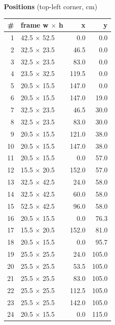 \documentclass[a4paper,landscape,10pt]{article}
\begin{document}
\begin{minipage}[t]{0.25\textwidth}
\vspace{8pt}
{\bfseries Positions} (top-left corner, cm)\\[2pt]
\tiny
\begin{tabular}{@{}r l r r@{}}
\toprule
\# & frame w $\times$ h & x & y \\
\midrule
1 & 42.5 $\times$ 52.5 & 0.0 & 0.0 \\
2 & 32.5 $\times$ 23.5 & 46.5 & 0.0 \\
3 & 32.5 $\times$ 23.5 & 83.0 & 0.0 \\
4 & 23.5 $\times$ 32.5 & 119.5 & 0.0 \\
5 & 20.5 $\times$ 15.5 & 147.0 & 0.0 \\
6 & 20.5 $\times$ 15.5 & 147.0 & 19.0 \\
7 & 32.5 $\times$ 23.5 & 46.5 & 30.0 \\
8 & 32.5 $\times$ 23.5 & 83.0 & 30.0 \\
9 & 20.5 $\times$ 15.5 & 121.0 & 38.0 \\
10 & 20.5 $\times$ 15.5 & 147.0 & 38.0 \\
11 & 20.5 $\times$ 15.5 & 0.0 & 57.0 \\
12 & 15.5 $\times$ 20.5 & 152.0 & 57.0 \\
13 & 32.5 $\times$ 42.5 & 24.0 & 58.0 \\
14 & 32.5 $\times$ 42.5 & 60.0 & 58.0 \\
15 & 52.5 $\times$ 42.5 & 96.0 & 58.0 \\
16 & 20.5 $\times$ 15.5 & 0.0 & 76.3 \\
17 & 15.5 $\times$ 20.5 & 152.0 & 81.0 \\
18 & 20.5 $\times$ 15.5 & 0.0 & 95.7 \\
19 & 25.5 $\times$ 25.5 & 24.0 & 105.0 \\
20 & 25.5 $\times$ 25.5 & 53.5 & 105.0 \\
21 & 25.5 $\times$ 25.5 & 83.0 & 105.0 \\
22 & 25.5 $\times$ 25.5 & 112.5 & 105.0 \\
23 & 25.5 $\times$ 25.5 & 142.0 & 105.0 \\
24 & 20.5 $\times$ 15.5 & 0.0 & 115.0 \\
\bottomrule
\end{tabular}
\end{minipage}
\clearpage
\end{document}
